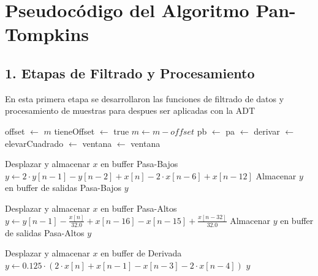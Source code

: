 \section*{Pseudocódigo del Algoritmo Pan-Tompkins}

\subsection{1. Etapas de Filtrado y Procesamiento}
En esta primera etapa se desarrollaron las funciones de filtrado de datos y procesamiento de muestras para despues ser aplicadas con la ADT
\begin{algorithm}[H]
\caption{Procesamiento de Muestra}
\begin{algorithmic}[1]
        \State offset $\leftarrow$ $m$
        \State tieneOffset $\leftarrow$ true
    \EndIf
    \State $m \leftarrow m - offset$
    \State pb $\leftarrow$ 
    \State pa $\leftarrow$ 
    \State derivar $\leftarrow$ 
    \State elevarCuadrado $\leftarrow$ 
    \State ventana $\leftarrow$ 
    \State \Return ventana
\EndFunction
\end{algorithmic}
\end{algorithm}

\begin{algorithm}[H]
\caption{Filtro Pasa-Bajos}
\begin{algorithmic}[1]
    \State Desplazar y almacenar $x$ en buffer Pasa-Bajos
    \State $y \leftarrow 2 \cdot y[n-1] - y[n-2] + x[n] - 2 \cdot x[n-6] + x[n-12]$
    \State Almacenar $y$ en buffer de salidas Pasa-Bajos
    \State \Return $y$
\EndFunction
\end{algorithmic}
\end{algorithm}

\begin{algorithm}[H]
\caption{Filtro Pasa-Altos}
\begin{algorithmic}[1]
    \State Desplazar y almacenar $x$ en buffer Pasa-Altos
    \State $y \leftarrow y[n-1] - \frac{x[n]}{32.0} + x[n-16] - x[n-15] + \frac{x[n-32]}{32.0}$
    \State Almacenar $y$ en buffer de salidas Pasa-Altos
    \State \Return $y$
\EndFunction
\end{algorithmic}
\end{algorithm}

\begin{algorithm}[H]
\caption{Derivada}
\begin{algorithmic}[1]
    \State Desplazar y almacenar $x$ en buffer de Derivada
    \State $y \leftarrow 0.125 \cdot (2 \cdot x[n] + x[n-1] - x[n-3] - 2 \cdot x[n-4])$
    \State \Return $y$
\EndFunction
\end{algorithmic}
\end{algorithm}

